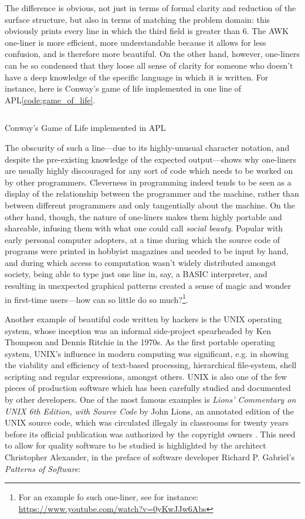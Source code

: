 The difference is obvious, not just in terms of formal clarity and reduction of the surface structure, but also in terms of matching the problem domain: this obviously prints every line in which the third field is greater than 6. The AWK one-liner is more efficient, more understandable because it allows for less confusion, and is therefore more beautiful. On the other hand, however, one-liners can be so condensed that they loose all sense of clarity for someone who doesn't have a deep knowledge of the specific language in which it is written. For instance, here is Conway's game of life implemented in one line of APL\ref{code:game_of_life}.

\begin{listing}
  \inputminted{text}{./corpus/game_of_life.apl}
  \caption{Conway's Game of Life implemented in APL}
  \label{code:game_of_life}
\end{listing}

The obscurity of such a line—due to its highly-unusual character notation, and despite the pre-existing knowledge of the expected output—shows why one-liners are usually highly discouraged for any sort of code which needs to be worked on by other programmers. Cleverness in programming indeed tends to be seen as a display of the relationship between the programmer and the machine, rather than between different programmers and only tangentially about the machine. On the other hand, though, the nature of one-liners makes them highly portable and shareable, infusing them with what one could call \emph{social beauty}. Popular with early personal computer adopters, at a time during which the source code of programs were printed in hobbyist magazines and needed to be input by hand, and during which access to computation wasn't widely distributed amongst society, being able to type just one line in, say, a BASIC interpreter, and resulting in unexpected graphical patterns created a sense of magic and wonder in first-time users—how can so little do so much?\footnote{For an example fo such one-liner, see for instance: \url{https://www.youtube.com/watch?v=0yKwJJw6Abs}}.

Another example of beautiful code written by hackers is the UNIX operating system, whose inception was an informal side-project spearheaded by Ken Thompson and Dennis Ritchie in the 1970s. As the first portable operating system, UNIX's influence in modern computing was significant, e.g. in showing the viability and efficiency of text-based processing, hierarchical file-system, shell scripting and regular expressions, amongst others. UNIX is also one of the few pieces of production software which has been carefully studied and documented by other developers. One of the most famous examples is \emph{Lions' Commentary on UNIX 6th Edition, with Source Code} by John Lions, an annotated edition of the UNIX source code, which was circulated illegaly in classrooms for twenty years before its official publication was authorized by the copyright owners \citep{lions_lions_1996}. This need to allow for quality software to be studied is highlighted by the architect Christopher Alexander, in the preface of software developer Richard P. Gabriel's \textit{Patterns of Software}:

